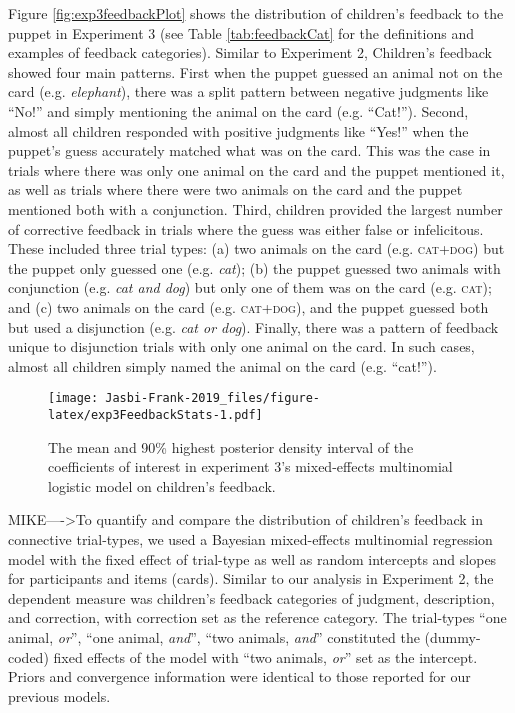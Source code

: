 \documentclass[,man,floatsintext]{apa6}
\begin{document}
Figure \ref{fig:exp3feedbackPlot} shows the distribution of children's feedback to the puppet in Experiment 3 (see Table \ref{tab:feedbackCat} for the definitions and examples of feedback categories). Similar to Experiment 2, Children's feedback showed four main patterns. First when the puppet guessed an animal not on the card (e.g. \emph{elephant}), there was a split pattern between negative judgments like \enquote{No!} and simply mentioning the animal on the card (e.g. \enquote{Cat!}). Second, almost all children responded with positive judgments like \enquote{Yes!} when the puppet's guess accurately matched what was on the card. This was the case in trials where there was only one animal on the card and the puppet mentioned it, as well as trials where there were two animals on the card and the puppet mentioned both with a conjunction. Third, children provided the largest number of corrective feedback in trials where the guess was either false or infelicitous. These included three trial types: (a) two animals on the card (e.g. \textsc{cat+dog}) but the puppet only guessed one (e.g. \emph{cat}); (b) the puppet guessed two animals with conjunction (e.g. \emph{cat and dog}) but only one of them was on the card (e.g. \textsc{cat}); and (c) two animals on the card (e.g. \textsc{cat+dog}), and the puppet guessed both but used a disjunction (e.g. \emph{cat or dog}). Finally, there was a pattern of feedback unique to disjunction trials with only one animal on the card. In such cases, almost all children simply named the animal on the card (e.g. \enquote{cat!}).

\begin{figure}
\centering
\texttt{[image: Jasbi-Frank-2019\_files/figure-latex/exp3FeedbackStats-1.pdf]}
\caption{\label{fig:exp3FeedbackStats}The mean and 90\% highest posterior density interval of the coefficients of interest in experiment 3's mixed-effects multinomial logistic model on children's feedback.}
\end{figure}

MIKE----\textgreater{}To quantify and compare the distribution of children's feedback in connective trial-types, we used a Bayesian mixed-effects multinomial regression model with the fixed effect of trial-type as well as random intercepts and slopes for participants and items (cards). Similar to our analysis in Experiment 2, the dependent measure was children's feedback categories of judgment, description, and correction, with correction set as the reference category. The trial-types \enquote{one animal, \emph{or}}, \enquote{one animal, \emph{and}}, \enquote{two animals, \emph{and}} constituted the (dummy-coded) fixed effects of the model with \enquote{two animals, \emph{or}} set as the intercept. Priors and convergence information were identical to those reported for our previous models.
\end{document}
